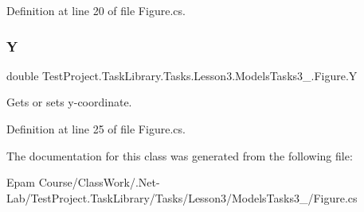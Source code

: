 Definition at line 20 of file Figure.\+cs.

\mbox{\label{class_test_project_1_1_task_library_1_1_tasks_1_1_lesson3_1_1_models_tasks3__4_1_1_figure_a5e91c21bced0a6ef22dc6319d03be9f3}} 
\subsubsection{\texorpdfstring{Y}{Y}}
{\footnotesize\ttfamily double Test\+Project.\+Task\+Library.\+Tasks.\+Lesson3.\+Models\+Tasks3\+\_.\+Figure.\+Y\hspace{0.3cm}{\ttfamily [get]}}



Gets or sets y-\/coordinate. 



Definition at line 25 of file Figure.\+cs.



The documentation for this class was generated from the following file\+:\begin{DoxyCompactItemize}
\item 
Epam Course/\+Class\+Work/.\+Net-\/\+Lab/\+Test\+Project.\+Task\+Library/\+Tasks/\+Lesson3/\+Models\+Tasks3\+\_/Figure.\+cs\end{DoxyCompactItemize}
